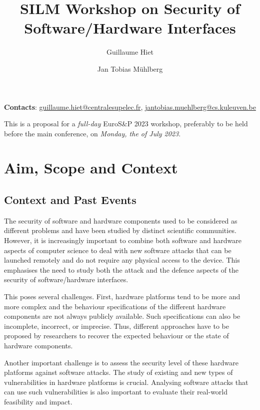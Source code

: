 \documentclass[a4paper,11pt]{article}
\title{SILM Workshop on Security of Software/Hardware Interfaces}
\date{}
\author{Guillaume Hiet}
\affil{CIDRE team, CentraleSupélec/Inria, IRISA, France}
\author{Jan Tobias M\"uhlberg}
\affil{imec-DistriNet, KU Leuven, Belgium}
\newcommand{\SILMYear}{2023}
\newcommand{\SILMDate}{Monday, the \nth{3} of July 2023}
\begin{document}
\maketitle

\begin{center}
 \textbf{Contacts}:  \url{guillaume.hiet@centralesupelec.fr},
\url{jantobias.muehlberg@cs.kuleuven.be}
\end{center}

\noindent This is a proposal for a \emph{full-day} EuroS\&P \SILMYear{}
workshop, preferably to be held before the main conference, on
\emph{\SILMDate}.

\section{Aim, Scope and Context}
%
\subsection{Context and Past Events}
%
The security of software and hardware components used to be considered as
different problems and have been studied by distinct scientific
communities. However, it is increasingly important to combine both software
and hardware aspects of computer science to deal with new software attacks
that can be launched remotely and do not require any physical access to the
device. This emphasises the need to study both the attack and the defence
aspects of the security of software/hardware interfaces.

This poses several challenges. First, hardware platforms tend to be more
and more complex and the behaviour specifications of the different hardware
components are not always publicly available. Such specifications can also
be incomplete, incorrect, or imprecise. Thus, different approaches have to
be proposed by researchers to recover the expected behaviour or the state of
hardware components.

Another important challenge is to assess the security level of these
hardware platforms against software attacks. The study of existing and new
types of vulnerabilities in hardware platforms is crucial. Analysing
software attacks that can use such vulnerabilities is also important to
evaluate their real-world feasibility and impact.
\end{document}
